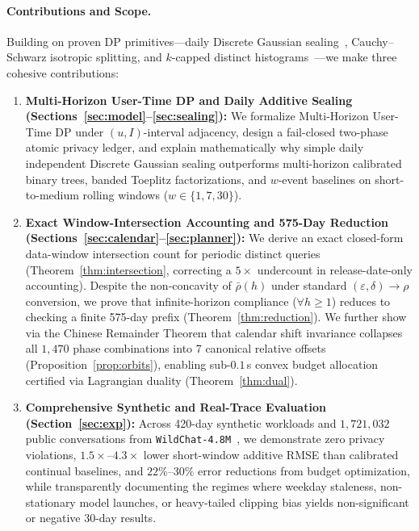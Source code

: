 \documentclass[sigconf, nonacm]{acmart}
\begin{document}
\paragraph{Contributions and Scope.}
Building on proven DP primitives---daily Discrete Gaussian sealing~\cite{canonne2020discrete}, Cauchy--Schwarz isotropic splitting, and $k$-capped distinct histograms~\cite{amin2019bounding}---we make three cohesive contributions:
\begin{enumerate}[leftmargin=*, nosep, topsep=2pt]
    \item \textbf{Multi-Horizon User-Time DP and Daily Additive Sealing (Sections~\ref{sec:model}--\ref{sec:sealing}):} We formalize Multi-Horizon User-Time DP under $(u, I)$-interval adjacency, design a fail-closed two-phase atomic privacy ledger, and explain mathematically why simple daily independent Discrete Gaussian sealing outperforms multi-horizon calibrated binary trees, banded Toeplitz factorizations, and $w$-event baselines on short-to-medium rolling windows ($w \in \{1, 7, 30\}$).
    \item \textbf{Exact Window-Intersection Accounting and 575-Day Reduction (Sections~\ref{sec:calendar}--\ref{sec:planner}):} We derive an exact closed-form data-window intersection count for periodic distinct queries (Theorem~\ref{thm:intersection}, correcting a $5\times$ undercount in release-date-only accounting). Despite the non-concavity of $\bar{\rho}(h)$ under standard $(\varepsilon, \delta) \to \rho$ conversion, we prove that infinite-horizon compliance ($\forall h \ge 1$) reduces to checking a finite 575-day prefix (Theorem~\ref{thm:reduction}). We further show via the Chinese Remainder Theorem that calendar shift invariance collapses all $1{,}470$ phase combinations into 7 canonical relative offsets (Proposition~\ref{prop:orbits}), enabling sub-$0.1\,$s convex budget allocation certified via Lagrangian duality (Theorem~\ref{thm:dual}).
    \item \textbf{Comprehensive Synthetic and Real-Trace Evaluation (Section~\ref{sec:exp}):} Across 420-day synthetic workloads and $1{,}721{,}032$ public conversations from \texttt{WildChat-4.8M}~\cite{zhao2024wildchat}, we demonstrate zero privacy violations, $1.5\times\text{--}4.3\times$ lower short-window additive RMSE than calibrated continual baselines, and $22\%\text{--}30\%$ error reductions from budget optimization, while transparently documenting the regimes where weekday staleness, non-stationary model launches, or heavy-tailed clipping bias yields non-significant or negative 30-day results.
\end{enumerate}
\end{document}
